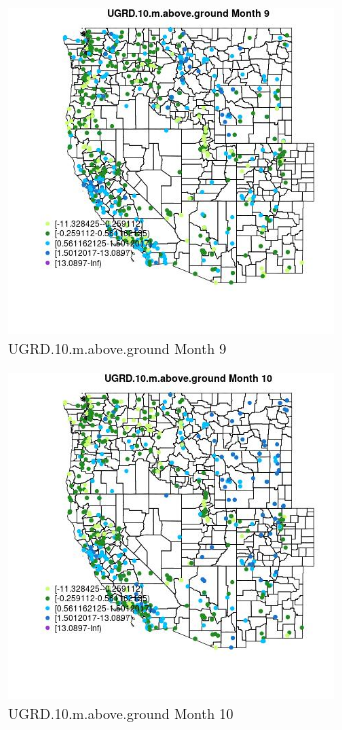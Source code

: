 \begin{figure} 
\centering  
\includegraphics[width=0.77\textwidth]{Code_Outputs/Report_ML_input_PM25_Step4_part_e_de_duplicated_aves_compiled_2019-05-14wNAs_MapObsMo9UGRD10maboveground.jpg} 
\caption{\label{fig:Report_ML_input_PM25_Step4_part_e_de_duplicated_aves_compiled_2019-05-14wNAsMapObsMo9UGRD10maboveground}UGRD.10.m.above.ground Month 9} 
\end{figure} 
 

\begin{figure} 
\centering  
\includegraphics[width=0.77\textwidth]{Code_Outputs/Report_ML_input_PM25_Step4_part_e_de_duplicated_aves_compiled_2019-05-14wNAs_MapObsMo10UGRD10maboveground.jpg} 
\caption{\label{fig:Report_ML_input_PM25_Step4_part_e_de_duplicated_aves_compiled_2019-05-14wNAsMapObsMo10UGRD10maboveground}UGRD.10.m.above.ground Month 10} 
\end{figure} 
 

